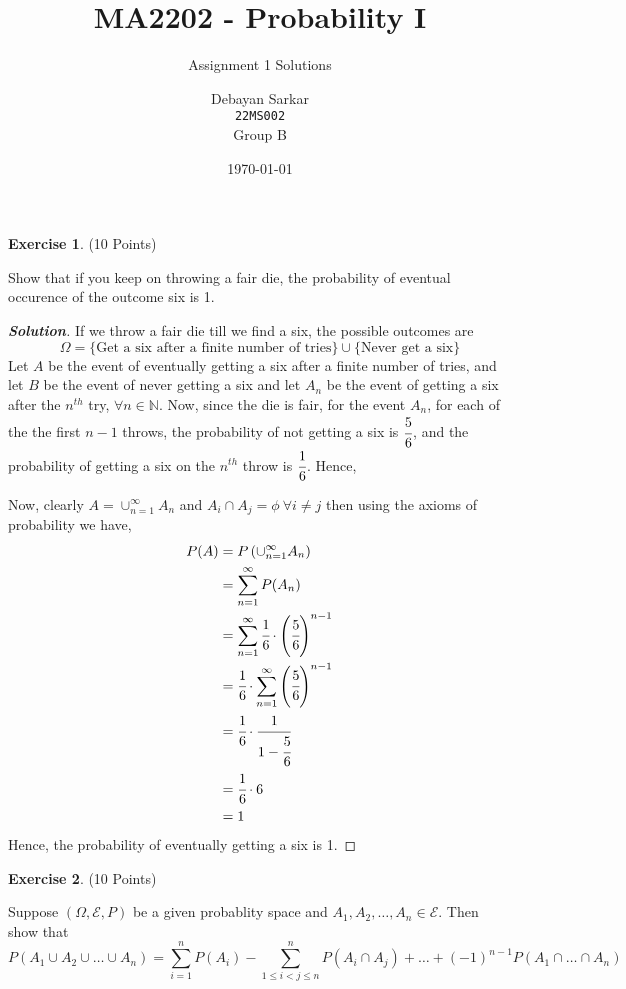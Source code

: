 \documentclass[10pt]{scrartcl}
\title{MA2202 - Probability I}
\subtitle{Assignment 1 Solutions}
\author{Debayan Sarkar \\ \texttt{22MS002} \\ Group B}
\date{\today}
\theoremstyle{definition}
\newtheorem{exercise}{Exercise}
\newenvironment{solution} {\begin{proof}[\normalfont \textbf{Solution}]} {\end{proof}}
\newcommand{\nn}{\mathbb{N}}
\begin{document}
\maketitle
\begin{exercise}(10 Points)

    Show that if you keep on throwing a fair die, the probability of eventual occurence of the outcome six is 1.
\end{exercise}
\begin{solution}
    If we throw a fair die till we find a six, the possible outcomes are $$\Omega = \{\text{Get a six after a finite number of tries} \} \cup \{ \text{Never get a six} \}$$
    Let $A$ be the event of eventually getting a six after a finite number of tries, and let $B$ be the event of never getting a six
    and let $A_n$ be the event of getting a six after the $n^{th}$ try, $\forall n\in \nn$. Now, since the die is fair, for the event 
    $A_n$, for each of the the first $n-1$ throws, the probability of not getting a six is $\cfrac{5}{6}$, and the probability of getting a six
    on the $n^{th}$ throw is $\cfrac{1}{6}$. Hence, 

    Now, clearly $A = \cup_{n=1}^{\infty}A_n$ and $A_i \cap A_j = \phi ~ \forall i \neq j$ then using the axioms of probability we have, 
    \begin{align*}
        P(A) &= P\left(\cup_{n=1}^{\infty} A_n\right) \\ 
             &= \sum_{n=1}^{\infty} P(A_n) \\ 
             &= \sum_{n = 1}^{\infty} \cfrac{1}{6} \cdot \left(\cfrac{5}{6}\right)^{n-1} \\ 
             &= \cfrac{1}{6}\cdot \sum_{n = 1}^{\infty} \left(\cfrac{5}{6}\right)^{n-1} \\ 
             &= \cfrac{1}{6} \cdot \cfrac{1}{1- \cfrac{5}{6}} \\ 
             &= \cfrac{1}{6}\cdot 6 \\ 
             &= 1
    \end{align*}
    Hence, the probability of eventually getting a six is 1.
\end{solution}
\clearpage
\begin{exercise}(10 Points)

    Suppose $(\Omega, \mathcal{E}, P)$ be a given probablity space and $A_1, A_2, \dots ,A_n \in \mathcal{E}$. Then show that 
    $$P(A_1 \cup A_2 \cup \dots \cup A_n) = \sum_{i=1}^{n}P(A_i) - \sum_{1\leq i < j\leq n}^{n}P(A_i \cap A_j) + \dots + (-1)^{n - 1}P(A_1 \cap \dots \cap A_n)$$
\end{exercise}
\end{document}
